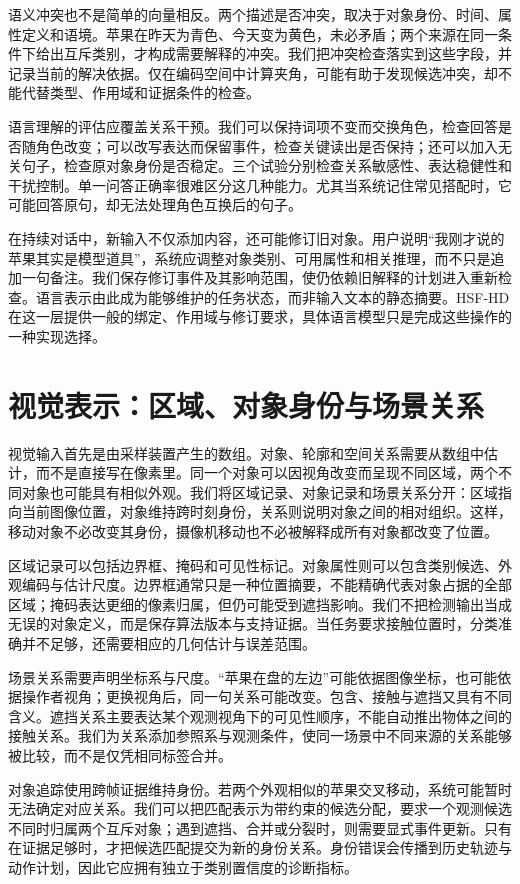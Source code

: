 语义冲突也不是简单的向量相反。两个描述是否冲突，取决于对象身份、时间、属性定义和语境。苹果在昨天为青色、今天变为黄色，未必矛盾；两个来源在同一条件下给出互斥类别，才构成需要解释的冲突。我们把冲突检查落实到这些字段，并记录当前的解决依据。仅在编码空间中计算夹角，可能有助于发现候选冲突，却不能代替类型、作用域和证据条件的检查。

语言理解的评估应覆盖关系干预。我们可以保持词项不变而交换角色，检查回答是否随角色改变；可以改写表达而保留事件，检查关键读出是否保持；还可以加入无关句子，检查原对象身份是否稳定。三个试验分别检查关系敏感性、表达稳健性和干扰控制。单一问答正确率很难区分这几种能力。尤其当系统记住常见搭配时，它可能回答原句，却无法处理角色互换后的句子。

在持续对话中，新输入不仅添加内容，还可能修订旧对象。用户说明“我刚才说的苹果其实是模型道具”，系统应调整对象类别、可用属性和相关推理，而不只是追加一句备注。我们保存修订事件及其影响范围，使仍依赖旧解释的计划进入重新检查。语言表示由此成为能够维护的任务状态，而非输入文本的静态摘要。HSF-HD 在这一层提供一般的绑定、作用域与修订要求，具体语言模型只是完成这些操作的一种实现选择。

\section{视觉表示：区域、对象身份与场景关系}
\label{sec:vision_structure}

视觉输入首先是由采样装置产生的数组。对象、轮廓和空间关系需要从数组中估计，而不是直接写在像素里。同一个对象可以因视角改变而呈现不同区域，两个不同对象也可能具有相似外观。我们将区域记录、对象记录和场景关系分开：区域指向当前图像位置，对象维持跨时刻身份，关系则说明对象之间的相对组织。这样，移动对象不必改变其身份，摄像机移动也不必被解释成所有对象都改变了位置。

区域记录可以包括边界框、掩码和可见性标记。对象属性则可以包含类别候选、外观编码与估计尺度。边界框通常只是一种位置摘要，不能精确代表对象占据的全部区域；掩码表达更细的像素归属，但仍可能受到遮挡影响。我们不把检测输出当成无误的对象定义，而是保存算法版本与支持证据。当任务要求接触位置时，分类准确并不足够，还需要相应的几何估计与误差范围。

场景关系需要声明坐标系与尺度。“苹果在盘的左边”可能依据图像坐标，也可能依据操作者视角；更换视角后，同一句关系可能改变。包含、接触与遮挡又具有不同含义。遮挡关系主要表达某个观测视角下的可见性顺序，不能自动推出物体之间的接触关系。我们为关系添加参照系与观测条件，使同一场景中不同来源的关系能够被比较，而不是仅凭相同标签合并。

对象追踪使用跨帧证据维持身份。若两个外观相似的苹果交叉移动，系统可能暂时无法确定对应关系。我们可以把匹配表示为带约束的候选分配，要求一个观测候选不同时归属两个互斥对象；遇到遮挡、合并或分裂时，则需要显式事件更新。只有在证据足够时，才把候选匹配提交为新的身份关系。身份错误会传播到历史轨迹与动作计划，因此它应拥有独立于类别置信度的诊断指标。

